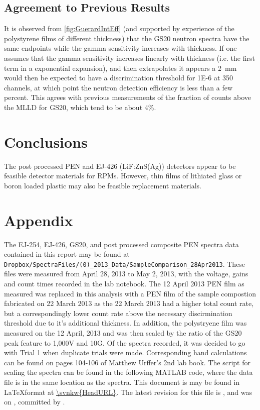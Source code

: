 \documentclass[onecolumn]{IEEEtran}
\begin{document}
\subsection{Agreement to Previous Results}
It is observed from \autoref{fig:GuerardIntEff} (and supported by experience of the polystyrene films of different thickness) that the GS20 neutron spectra have the same endpoints while the gamma sensitivity increases with thickness.
If one assumes that the gamma sensitivity increases linearly with thickness (i.e. the first term in a exponential expansion), and then extrapolates it appears a \SI{2}{\mm} would then be expected to have a discrimination threshold for \num{1E-6} at 350 channels, at which point the neutron detection efficiency is less than a few percent.
This agrees with previous measurements of the fraction of counts above the MLLD for GS20, which tend to be about 4\%.

\section{Conclusions}
The post processed PEN and EJ-426 (LiF:ZnS(Ag)) detectors appear to be feasible detector materials for RPMs.
However, thin films of lithiated glass or boron loaded plastic may also be feasible replacement materials.
\section{Appendix}
The EJ-254, EJ-426, GS20, and post processed composite PEN spectra data contained in this report may be found at \verb+Dropbox/SpectraFiles/(0)_2013_Data/SampleComparison_28Apr2013+.
These files were measured from April 28, 2013 to May 2, 2013, with the voltage, gains and count times recorded in the lab notebook.
The 12 April 2013 PEN film as measured was replaced in this analysis with a PEN film of the sample compostion fabricated on 22 March 2013 as the 22 March 2013 had a higher total count rate, but a correspondingly lower count rate above the necessary discirmination threshold due to it's additional thickness.
In addition, the polystryene film was measured on the 12 April, 2013 and was then scaled by the ratio of the GS20 peak feature to 1,000V and 10G.
Of the spectra recorded, it was decided to go with Trial 1 when duplicate trials were made.
Corresponding hand calculations can be found on pages 104-106 of Matthew Urffer's 2nd lab book.
The script for scaling the spectra can be found in the following MATLAB code, where the data file is in the same location as the spectra.
This document is may be found in \LaTeX format at \url{\svnkw{HeadURL}}.  
The latest revision for this file is \svnrev, and was on \svndate, committed by \svnauthor.
\end{document}
